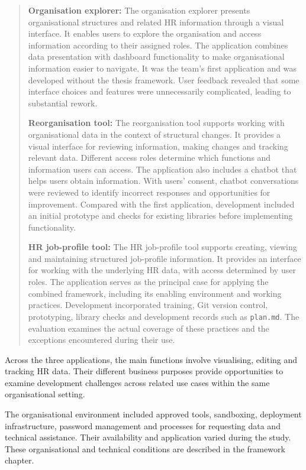 \documentclass[10pt,a4paper]{article}
\begin{document}
\begin{quote}
\textbf{Organisation explorer:} The organisation explorer presents organisational structures and
related HR information through a visual interface. It enables users
to explore the organisation and access information according to
their assigned roles. The application combines data presentation
with dashboard functionality to make organisational information
easier to navigate. It was the team's first application and was
developed without the thesis framework. User feedback revealed that
some interface choices and features were unnecessarily complicated,
leading to substantial rework.

\textbf{Reorganisation tool:} The reorganisation tool supports working with organisational data
in the context of structural changes. It provides a visual interface
for reviewing information, making changes and tracking relevant
data. Different access roles determine which functions and
information users can access. The application also includes a
chatbot that helps users obtain information. With users' consent,
chatbot conversations were reviewed to identify incorrect responses
and opportunities for improvement. Compared with the first
application, development included an initial prototype and checks
for existing libraries before implementing functionality.

\textbf{HR job-profile tool:} The HR job-profile tool supports creating, viewing and maintaining
structured job-profile information. It provides an interface for
working with the underlying HR data, with access determined by
user roles. The application serves as the principal case for
applying the combined framework, including its enabling environment
and working practices. Development incorporated training, Git
version control, prototyping, library checks and development records
such as \texttt{plan.md}. The evaluation examines the actual coverage
of these practices and the exceptions encountered during their use.
\end{quote}

Across the three applications, the main functions involve visualising,
editing and tracking HR data. Their different business purposes
provide opportunities to examine development challenges across
related use cases within the same organisational setting.

The organisational environment
included approved tools, sandboxing, deployment infrastructure,
password management and processes for requesting data and
technical assistance. Their availability and application varied
during the study. These organisational and technical conditions
are described in the framework chapter.
\end{document}
